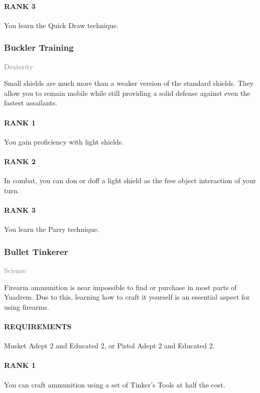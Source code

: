 \paragraph{RANK 3} You learn the Quick Draw technique.

\subsubsection{Buckler Training} \label{feat::bucklertraining}
\small{\textcolor{gray}{Dexterity}}

\normalsize
Small shields are much more than a weaker version of the standard shields.
They allow you to remain mobile while still providing a solid defense against even the fastest assailants.
\paragraph{RANK 1} You gain proficiency with light shields.
\paragraph{RANK 2} In combat, you can don or doff a light shield as the free object interaction of your turn.
\paragraph{RANK 3} You learn the Parry technique.

\subsubsection{Bullet Tinkerer} \label{feat::bullettinkerer}
\small{\textcolor{gray}{Science}}

\normalsize
Firearm ammunition is near impossible to find or purchase in most parts of Yuadrem.
Due to this, learning how to craft it yourself is an essential aspect for using firearms.
\paragraph{REQUIREMENTS} Musket Adept 2 and Educated 2, or Pistol Adept 2 and Educated 2.
\paragraph{RANK 1} You can craft ammunition using a set of Tinker's Tools at half the cost.

